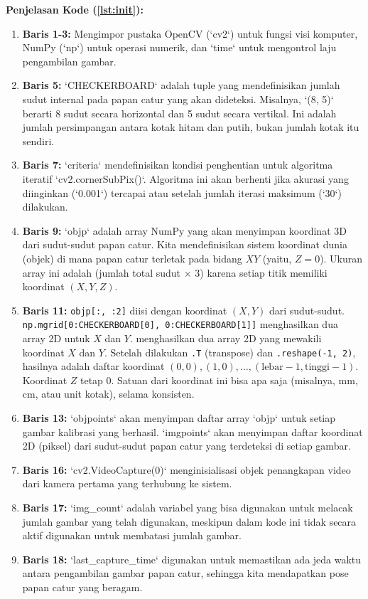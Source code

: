 \documentclass[12pt,a4paper]{article}
\begin{document}
\textbf{Penjelasan Kode (\ref{lst:init}):}
\begin{enumerate}[label={}, itemsep=0cm]
    \item \textbf{Baris 1-3:} Mengimpor pustaka OpenCV (`cv2`) untuk fungsi visi komputer, NumPy (`np`) untuk operasi numerik, dan `time` untuk mengontrol laju pengambilan gambar.
    \item \textbf{Baris 5:} `CHECKERBOARD` adalah tuple yang mendefinisikan jumlah sudut internal pada papan catur yang akan dideteksi. Misalnya, `(8, 5)` berarti 8 sudut secara horizontal dan 5 sudut secara vertikal. Ini adalah jumlah persimpangan antara kotak hitam dan putih, bukan jumlah kotak itu sendiri.
    \item \textbf{Baris 7:} `criteria` mendefinisikan kondisi penghentian untuk algoritma iteratif `cv2.cornerSubPix()`. Algoritma ini akan berhenti jika akurasi yang diinginkan (`0.001`) tercapai atau setelah jumlah iterasi maksimum (`30`) dilakukan.
    \item \textbf{Baris 9:} `objp` adalah array NumPy yang akan menyimpan koordinat 3D dari sudut-sudut papan catur. Kita mendefinisikan sistem koordinat dunia (objek) di mana papan catur terletak pada bidang $XY$ (yaitu, $Z=0$). Ukuran array ini adalah (jumlah total sudut $\times$ 3) karena setiap titik memiliki koordinat $(X, Y, Z)$.
    \item \textbf{Baris 11:} \texttt{objp[:, :2]} diisi dengan koordinat $(X, Y)$ dari sudut-sudut.
          \texttt{np.mg\-rid[0:\-CHECKERBOARD[0],\ 0:\-CHECKERBOARD[1]]}
          menghasilkan dua array 2D untuk $X$ dan $Y$. menghasilkan dua array 2D yang mewakili koordinat $X$ dan $Y$.
          Setelah dilakukan \texttt{.T} (transpose) dan \texttt{.reshape(-1, 2)}, hasilnya adalah daftar koordinat $(0,0), (1,0), \dots, (\text{lebar}-1, \text{tinggi}-1)$.
          Koordinat $Z$ tetap 0. Satuan dari koordinat ini bisa apa saja (misalnya, mm, cm, atau unit kotak), selama konsisten.
    \item \textbf{Baris 13:} `objpoints` akan menyimpan daftar array `objp` untuk setiap gambar kalibrasi yang berhasil. `imgpoints` akan menyimpan daftar koordinat 2D (piksel) dari sudut-sudut papan catur yang terdeteksi di setiap gambar.
    \item \textbf{Baris 16:} `cv2.VideoCapture(0)` menginisialisasi objek penangkapan video dari kamera pertama yang terhubung ke sistem.
    \item \textbf{Baris 17:} `img\_count`
          adalah variabel yang bisa digunakan untuk melacak jumlah gambar yang telah digunakan, meskipun dalam kode ini tidak secara aktif digunakan untuk membatasi jumlah gambar.
    \item \textbf{Baris 18:} `last\_capture\_time`
          digunakan untuk memastikan ada jeda waktu antara pengambilan gambar papan catur, sehingga kita mendapatkan pose papan catur yang beragam.
\end{enumerate}
\end{document}
